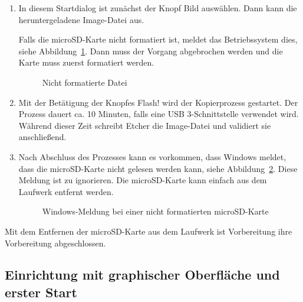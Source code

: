 \begin{enumerate}
\begin{itemize}
\begin{enumerate}
			\item In diesem Startdialog ist zunächst der Knopf \glqq Bild auswählen\grqq{}. Dann kann die heruntergeladene Image-Datei aus.
			
			Falls die microSD-Karte nicht formatiert ist, meldet das Betriebssystem dies, siehe Abbildung~\ref{JetPack:NichtFormatiert}. Dann muss der Vorgang abgebrochen werden und die Karte muss zuerst formatiert werden.

            \begin{figure}
              \centering

              
              \caption{Nicht formatierte Datei}\label{JetPack:NichtFormatiert}
            \end{figure}			
			
			\item Mit der Betätigung der Knopfes \glqq Flash!\grqq{} wird der Kopierprozess gestartet. Der Prozess dauert ca. 10 Minuten, falls eine USB 3-Schnittstelle verwendet wird. Während dieser Zeit schreibt Etcher die Image-Datei und validiert sie anschließend.
			\item  Nach Abschluss des Prozesses kann es vorkommen, dass Windows meldet, dass die microSD-Karte nicht gelesen werden kann, siehe Abbildung~\ref{JetPack:NichtLesen}. Diese Meldung ist zu ignorieren. Die microSD-Karte kann einfach aus dem Laufwerk entfernt werden. 
			
			\begin{figure}
				\centering
			
	 
	            \caption{Windows-Meldung bei einer nicht formatierten microSD-Karte}\label{JetPack:NichtLesen}		
			\end{figure}
			
		\end{enumerate}
		
	\end{itemize}
\end{enumerate}  

Mit dem Entfernen der microSD-Karte aus dem Laufwerk ist Vorbereitung ihre Vorbereitung abgeschlossen. 


\subsection{Einrichtung mit graphischer Oberfläche und erster Start}

